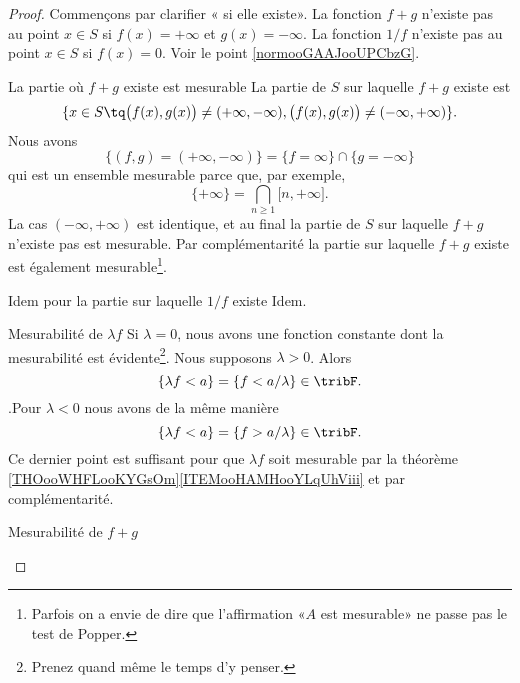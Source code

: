 \begin{proof}
    Commençons par clarifier « si elle existe». La fonction \( f+g\) n'existe pas au point \( x\in S\) si \( f(x)=+\infty\) et \( g(x)=-\infty\). La fonction \( 1/f\) n'existe pas au point \( x\in S\) si \( f(x)=0\). Voir le point \ref{normooGAAJooUPCbzG}.
    \begin{subproof}
    \item[La partie où \( f+g\) existe est mesurable]
        La partie de \( S\) sur laquelle \( f+g\) existe est 
        \begin{equation}
            \{ x\in S\tq \big( f(x),g(x) \big)\neq (+\infty,-\infty),\big( f(x),g(x) \big)\neq (-\infty,+\infty) \}.
        \end{equation}
        Nous avons
        \begin{equation}
            \{  (f,g)=(+\infty,-\infty) \}=\{ f=\infty \}\cap\{ g=-\infty \}
        \end{equation}
        qui est un ensemble mesurable parce que, par exemple,
        \begin{equation}
            \{ +\infty \}=\bigcap_{n\geq 1}\mathopen[ n , +\infty \mathclose].
        \end{equation}
        La cas \( (-\infty,+\infty)\) est identique, et au final la partie de \( S\) sur laquelle \( f+g\) n'existe pas est mesurable. Par complémentarité la partie sur laquelle \( f+g\) existe est également mesurable\footnote{Parfois on a envie de dire que l'affirmation «\( A\) est mesurable» ne passe pas le test de Popper.}.
    \item[Idem pour la partie sur laquelle \( 1/f\) existe]
        Idem.
    \item[Mesurabilité de \( \lambda f\)]
        Si \( \lambda=0\), nous avons une fonction constante dont la mesurabilité est évidente\footnote{Prenez quand même le temps d'y penser.}. Nous supposons \( \lambda>0\). Alors
        \begin{equation}
            \{ \lambda f<a \}=\{ f<a/\lambda \}\in \tribF.
        \end{equation}
        .Pour \( \lambda<0\) nous avons de la même manière
        \begin{equation}
            \{ \lambda f<a \}=\{ f>a/\lambda \}\in \tribF.
        \end{equation}
        Ce dernier point est suffisant pour que \( \lambda f\) soit mesurable par la théorème \ref{THOooWHFLooKYGsOm}\ref{ITEMooHAMHooYLqUhViii} et par complémentarité.
    \item[Mesurabilité de \( f+g\)]

\end{subproof}
\end{proof}
